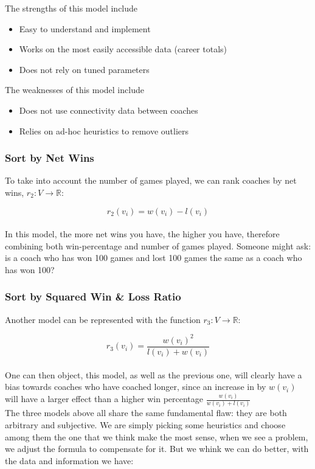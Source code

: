 \documentclass[titlepage]{article}
\begin{document}
\noindent The strengths of this model include 
\begin{itemize}
\item Easy to understand and implement
\item Works on the most easily accessible data (career totals)
\item Does not rely on tuned parameters
\end{itemize}

\noindent The weaknesses of this model include
\begin{itemize}
\item Does not use connectivity data between coaches
\item Relies on ad-hoc heuristics to remove outliers
\end{itemize}

\subsubsection{Sort by Net Wins}
To take into account the number of games played, we can rank coaches by net wins, $r_2: V \rightarrow \mathbb{R}$:

$$r_2(v_i) = w(v_i) - l(v_i)$$
\\

\noindent In this model, the more net wins you have, the higher you have, therefore combining both win-percentage and number of games played. Someone might ask: is a coach who has won 100 games and lost 100 games the same as a coach who has won 100?

\subsubsection{Sort by Squared Win \& Loss Ratio}
Another model can be represented with the function $r_3: V \rightarrow \mathbb{R}$:

$$r_3(v_i) = \frac{w(v_i)^2}{l(v_i) + w(v_i)}$$
\\

\noindent One can then object, this model, as well as the previous one, will clearly have a bias towards coaches who have coached longer, since an increase in by $w(v_i)$ will have a larger effect than a higher win percentage $\frac{w(v_i)}{w(v_i) + l(v_i)}$
\\

\noindent The three models above all share the same fundamental flaw: they are both arbitrary and subjective. We are simply picking some heuristics and choose among them the one that we think make the most sense, when we see a problem, we adjust the formula to compensate for it. But we whink we can do better, with the data and information we have:
\end{document}
